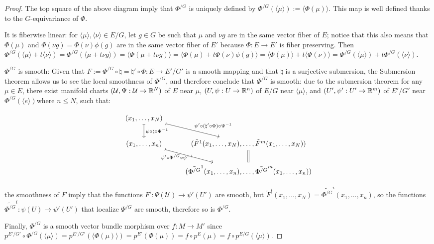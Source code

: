 \begin{proof}
The top square of the above diagram imply that $\Phi^{/G}$ is uniquely defined by $\Phi^{/G}(\langle \mu \rangle) := \langle \Phi(\mu) \rangle$. This map is well defined thanks to the $G$-equivariance of $\Phi$.

It is fiberwise linear: for $\langle \mu \rangle, \langle \nu \rangle \in E/G$, let $g \in G$ be such that $\mu$ and $\nu g$ are in the same vector fiber of $E$; notice that this also means that $\Phi(\mu)$ and $\Phi(\nu g) = \Phi(\nu) \phi(g)$ are in the same vector fiber of $E'$ because $\Phi:E \to E'$ is fiber preserving. 
Then $\Phi^{/G}(\langle \mu \rangle + t\langle \nu \rangle) = \Phi^{/G}(\langle \mu  + t \nu g \rangle)  = \langle \Phi(\mu + t \nu g ) \rangle = \langle \Phi(\mu) + t \Phi(\nu)\phi(g) \rangle = \langle \Phi(\mu) \rangle + t \langle \Phi(\nu) \rangle = \Phi^{/G}(\langle \mu \rangle) + t\Phi^{/G}(\langle \nu \rangle)$.

$\Phi^{/G}$ is smooth: Given that $F := \Phi^{/G} \circ \natural = \natural' \circ \Phi : E \to E'/G'$ is a smooth mapping and that $\natural$ is a surjective submersion, the Submersion theorem allows us to see the local smoothness of $\Phi^{/G}$, and therefore conclude that $\Phi^{/G}$ is smooth: due to the submersion theorem for any $\mu \in E$, there exist manifold charts $(\mathcal U, \Psi: \mathcal U \to \mathbb{R}^N)$ of $E$ near $\mu$, $(U, \psi: U \to \mathbb{R}^n)$ of $E/G$ near $\langle \mu \rangle$, and $(U', \psi': U' \to \mathbb{R}^m)$ of $E'/G'$ near $\Phi^{/G}(\langle e \rangle)$where $n \leq N$, such that: %

\[
\begin{tikzcd}
    (x_1, \dots, x_N) \arrow[mapsto]{rd}{\psi' \circ (\natural' \circ \Phi) \circ \Psi^{-1} } \arrow[mapsto]{d}{\psi \circ \natural \circ \Psi^{-1}} & \\
    (x_1, \dots, x_n) \arrow[mapsto]{rd}[below, near start]{\psi' \circ \Phi^{/G} \circ \psi^{-1}} & (\tilde F^1(x_1, \dots, x_N), \dots, \tilde F^m(x_1, \dots, x_N)) \arrow[equal]{d}\\
    & (\tilde{\Phi^{/G}}^1(x_1, \dots, x_n), \dots, \tilde{\Phi^{/G}}^m(x_1, \dots, x_n))
\end{tikzcd}
\]

the smoothness of $F$ imply that the functions $F^i:\Psi(\mathcal U) \to \psi'(U')$ are smooth, but $\tilde F^i(x_1, \dots, x_N) = \tilde{\Phi^{/G}}^i(x_1, \dots, x_n)$, so the functions $\tilde{\Phi^{/G}}^i:\psi(U) \to \psi'(U')$ that localize $\Psi^{/G}$ are smooth, therefore so is $\Phi^{/G}$. 

Finally, $\Phi^{/G}$ is a smooth vector bundle morphism over $f:M \to M'$ since $p^{E'/G'} \circ \Phi^{/G}(\langle \mu \rangle) = p^{E'/G'}(\langle \Phi(\mu) \rangle) = p^{E'}(\Phi(\mu)) = f \circ p^E (\mu) = f \circ p^{E/G} (\langle \mu \rangle)$.

\end{proof}

